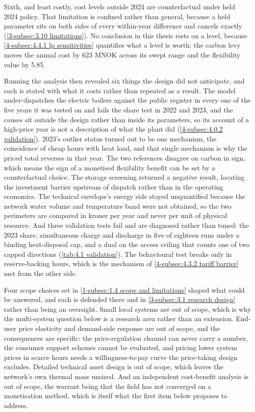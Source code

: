 Sixth, and least costly, cost levels outside 2024 are counterfactual under held 2024 policy. That limitation is confined rather than general, because a held parameter sits on both sides of every within-year difference and cancels exactly (\autoref{3-subsec:3.10 limitations}). No conclusion in this thesis rests on a level, because \autoref{4-subsec:4.4.1 lp sensitivities} quantifies what a level is worth: the carbon levy moves the annual cost by 623 MNOK across its swept range and the flexibility value by 5.85.

Running the analysis then revealed six things the design did not anticipate, and each is stated with what it costs rather than repeated as a result. The model under-dispatches the electric boilers against the public register in every one of the five years it was tested on and fails the share test in 2022 and 2023, and the causes sit outside the design rather than inside its parameters, so its account of a high-price year is not a description of what the plant did (\autoref{4-subsec:4.0.2 validation}). 2023's outlier status turned out to be one mechanism, the coincidence of cheap hours with heat load, and that single mechanism is why the priced total reverses in that year. The two references disagree on carbon in sign, which means the sign of a monetised flexibility benefit can be set by a counterfactual choice. The storage screening returned a negative result, locating the investment barrier upstream of dispatch rather than in the operating economics. The technical envelope's energy side stayed unquantified because the network water volume and temperature band were not obtained, so the two perimeters are compared in kroner per year and never per unit of physical resource. And three validation tests fail and are diagnosed rather than tuned: the 2023 share, simultaneous charge and discharge in five of eighteen runs under a binding heat-disposal cap, and a dual on the access ceiling that counts one of two capped directions (\autoref{tab:4.1 validation}). The behavioural test breaks only in reserve-backing hours, which is the mechanism of \autoref{4-subsec:4.3.2 tariff barrier} met from the other side.

Four scope choices set in \autoref{1-subsec:1.4 scope and limitations} shaped what could be answered, and each is defended there and in \autoref{3-subsec:3.1 research design} rather than being an oversight. Small local systems are out of scope, which is why the multi-system question below is a research area rather than an extension. End-user price elasticity and demand-side response are out of scope, and the consequences are specific: the price-regulation channel can never carry a number, the consumer support schemes cannot be evaluated, and pricing lower system prices in scarce hours needs a willingness-to-pay curve the price-taking design excludes. Detailed technical asset design is out of scope, which leaves the network's own thermal mass unsized. And an independent cost-benefit analysis is out of scope, the warrant being that the field has not converged on a monetisation method, which is itself what the first item below proposes to address.

